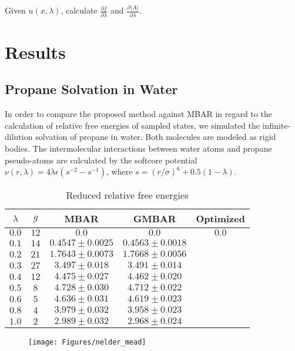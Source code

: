 \documentclass[aip,jcp,reprint,amsmath,amssymb]{revtex4-1}
\begin{document}
Given $u(x,\lambda)$, calculate $\frac{\partial f}{\partial \lambda}$ and $\frac{\partial \langle A \rangle}{\partial \lambda}$.

\section{Results}

\subsection{Propane Solvation in Water}

In order to compare the proposed method against MBAR in regard to the calculation of relative free energies of sampled states, we simulated the infinite-dilution solvation of propane in water. Both molecules are modeled as rigid bodies. The intermolecular interactions between water atoms and propane pseudo-atoms are calculated by the softcore potential\cite{Beutler_1994} $\nu(r,\lambda) = 4\lambda\epsilon(s^{-2} - s^{-1})$, where $s = (r/\sigma)^6 + 0.5 (1-\lambda)$.

\begin{table}
\caption{Reduced relative free energies}
\label{table:propane solvation}
\begin{ruledtabular}
\begin{tabular}{ccccc}
$\lambda$ & $g$ & MBAR & GMBAR & Optimized \\
\hline
$0.0$ & $12$ & $0.0$ & $0.0$ & $0.0$ \\
$0.1$ & $14$ & $0.4547 \pm 0.0025$ & $0.4563 \pm 0.0018$ \\
$0.2$ & $21$ & $1.7643 \pm 0.0073$ & $1.7668 \pm 0.0056$ \\
$0.3$ & $27$ &  $3.497 \pm 0.018$  &  $3.491 \pm 0.014$ \\
$0.4$ & $12$ &  $4.475 \pm 0.027$  &  $4.462 \pm 0.020$ \\
$0.5$ & $8$  &  $4.728 \pm 0.030$  &  $4.712 \pm 0.022$ \\
$0.6$ & $5$  &  $4.636 \pm 0.031$  &  $4.619 \pm 0.023$ \\
$0.8$ & $4$  &  $3.979 \pm 0.032$  &  $3.958 \pm 0.023$ \\
$1.0$ & $2$  &  $2.989 \pm 0.032$  &  $2.968 \pm 0.024$
\end{tabular}
\end{ruledtabular}
\end{table}

\begin{figure}
\centering
\texttt{[image: Figures/nelder\_mead]}
\caption{}
\label{fig:nelder_mead}
\end{figure}
\end{document}
